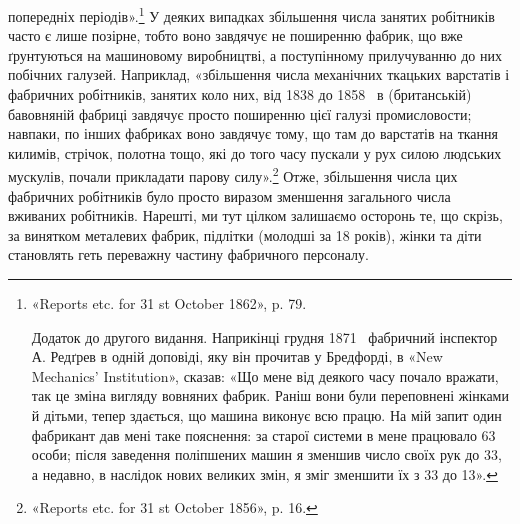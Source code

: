\parcont{}  %
попередніх періодів».\footnote{
«Reports etc. for 31 st October 1862», p. 79.

Додаток до другого видання. Наприкінці грудня 1871~ фабричний
інспектор А. Редґрев в одній доповіді, яку він прочитав у Бредфорді, в
«New Mechanics’ Institution», сказав: «Що мене від деякого часу почало
вражати, так це зміна вигляду вовняних фабрик. Раніш вони були переповнені
жінками й дітьми, тепер здається, що машина виконує всю працю.
На мій запит один фабрикант дав мені таке пояснення: за старої системи в
мене працювало 63 особи; після заведення поліпшених машин я зменшив
число своїх рук до 33, а недавно, в наслідок нових великих змін, я зміг
зменшити їх з 33 до 13».
} У деяких випадках збільшення числа
занятих робітників часто є лише позірне, тобто воно завдячує не
поширенню фабрик, що вже ґрунтуються на машиновому виробництві,
а поступінному прилучуванню до них побічних галузей.
Наприклад, «збільшення числа механічних ткацьких варстатів
і фабричних робітників, занятих коло них, від 1838 до 1858~
в (британській) бавовняній фабриці завдячує просто поширенню
цієї галузі промисловости; навпаки, по інших фабриках воно
завдячує тому, що там до варстатів на ткання килимів, стрічок,
полотна тощо, які до того часу пускали у рух силою людських
мускулів, почали прикладати парову силу».\footnote{
«Reports etc. for 31 st October 1856», p. 16.
} Отже, збільшення
числа цих фабричних робітників було просто виразом зменшення
загального числа вживаних робітників. Нарешті, ми тут цілком
залишаємо осторонь те, що скрізь, за винятком металевих фабрик,
підлітки (молодші за 18 років), жінки та діти становлять геть
переважну частину фабричного персоналу.

